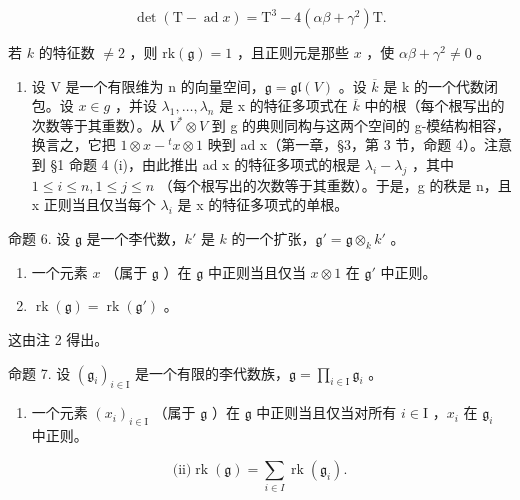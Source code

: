 \[
\det (\mathrm{T} - \operatorname{ad} x) = \mathrm{T} ^ {3} - 4 (\alpha \beta + \gamma^ {2}) \mathrm{T}.
\]

若 \(k\) 的特征数 \(\neq 2\) ，则 \(\mathrm{rk}(\mathfrak{g}) = 1\) ，且正则元是那些 \(x\) ，使 \(\alpha \beta + \gamma^2 \neq 0\) 。

\begin{enumerate}
\def\labelenumi{\arabic{enumi})}
\setcounter{enumi}{2}
\tightlist
\item
  设 V 是一个有限维为 n 的向量空间，\(\mathfrak{g} = \mathfrak{gl}(V)\) 。设 \(\overline{k}\) 是 k 的一个代数闭包。设 \(x \in g\) ，并设 \(\lambda_{1}, \ldots, \lambda_{n}\) 是 x 的特征多项式在 \(\overline{k}\) 中的根（每个根写出的次数等于其重数）。从 \(V^{*} \otimes V\) 到 g 的典则同构与这两个空间的 g-模结构相容，换言之，它把 \(1 \otimes x - {}^{t}x \otimes 1\) 映到 ad x（第一章，§3，第 3 节，命题 4）。注意到 §1 命题 4 (i)，由此推出 ad x 的特征多项式的根是 \(\lambda_{i} - \lambda_{j}\) ，其中 \(1 \leq i \leq n, 1 \leq j \leq n\) （每个根写出的次数等于其重数）。于是，g 的秩是 n，且 x 正则当且仅当每个 \(\lambda_{i}\) 是 x 的特征多项式的单根。
\end{enumerate}

命题 6. 设 \(\mathfrak{g}\) 是一个李代数，\(k'\) 是 \(k\) 的一个扩张，\(\mathfrak{g}' = \mathfrak{g} \otimes_k k'\) 。

\begin{enumerate}
\def\labelenumi{(\roman{enumi})}
\tightlist
\item
  一个元素 \(x\) （属于 \(\mathfrak{g}\) ）在 \(\mathfrak{g}\) 中正则当且仅当 \(x \otimes 1\) 在 \(\mathfrak{g}'\) 中正则。\\
\item
  \(\operatorname{rk}(\mathfrak{g}) = \operatorname{rk}(\mathfrak{g}')\) 。
\end{enumerate}

这由注 2 得出。

命题 7. 设 \((\mathfrak{g}_i)_{i\in \mathrm{I}}\) 是一个有限的李代数族，\(\mathfrak{g} = \prod_{i\in \mathrm{I}}\mathfrak{g}_i\) 。

\begin{enumerate}
\def\labelenumi{(\roman{enumi})}
\tightlist
\item
  一个元素 \((x_{i})_{i\in \mathrm{I}}\) （属于 \(\mathfrak{g}\) ）在 \(\mathfrak{g}\) 中正则当且仅当对所有 \(i\in \mathrm{I}\) ，\(x_{i}\) 在 \(\mathfrak{g}_i\) 中正则。
\end{enumerate}

\[
\text {(ii)} \operatorname{rk} (\mathfrak {g}) = \sum_ {i \in I} \operatorname{rk} (\mathfrak {g} _ {i}).
\]


